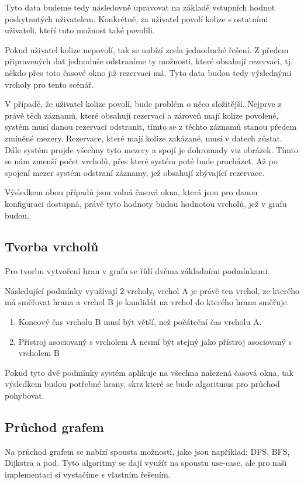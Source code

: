 Tyto data budeme tedy následovně upravovat na základě vstupních hodnot poskytnutých uživatelem. Konkrétně, za uživatel povolí kolize s ostatními uživateli, kteří tuto možnost také povolili.

Pokud uživatel kolize nepovolí, tak se nabízí zcela jednoduché řešení. Z předem připravených dat jednoduše odstraníme ty možnosti, které obsahují rezervaci, tj. někdo přes toto časové okno již rezervaci má. Tyto data budou tedy výslednými vrcholy pro tento scénář.

V případě, že uživatel kolize povolí, bude problém o něco složitější. Nejprve z právě těch záznamů, které obsahují rezervaci a zároveň mají kolize povolené, systém musí danou rezervaci odstranit, tímto se z těchto záznamů stanou předem zmíněné mezery. Rezervace, které mají kolize zakázané, musí v datech zůstat. Dále systém projde všechny tyto mezery a spojí je dohromady viz obrázek. %
Tímto se nám zmenší počet vrcholů, přes které systém poté bude procházet. Až po spojení mezer systém odstraní záznamy, jež obsahují zbývající rezervace.

Výsledkem obou případů jsou volná časová okna, která jsou pro danou konfiguraci dostupná, právě tyto hodnoty budou hodnotou vrcholů, jež v grafu budou.

\subsection{Tvorba vrcholů}
Pro tvorbu vytvoření hran v grafu se řídí dvěma základními podmínkami.

Následující podmínky využívají 2 vrcholy, vrchol A je právě ten vrchol, ze kterého má směřovat hrana a vrchol B je kandidát na vrchol do kterého hrana směřuje.
\begin{enumerate}
    \item Koncový čas vrcholu B musí být větší, než počáteční čas vrcholu A.
    \item Přístroj asociovaný s vrcholem A nesmí být stejný jako přístroj asociovaný s vrcholem B
\end{enumerate}

Pokud tyto dvě podmínky systém aplikuje na všechna nalezená časová okna, tak výsledkem budou potřebné hrany, skrz které se bude algoritmus pro průchod pohybovat.


\subsection{Průchod grafem}
Na průchod grafem se nabízí spousta možností, jako jsou například: DFS, BFS, Dijkstra a pod. Tyto algoritmy se dají využít na spoustu use-case, ale pro naši implementaci si vystačíme s vlastním řešením.


